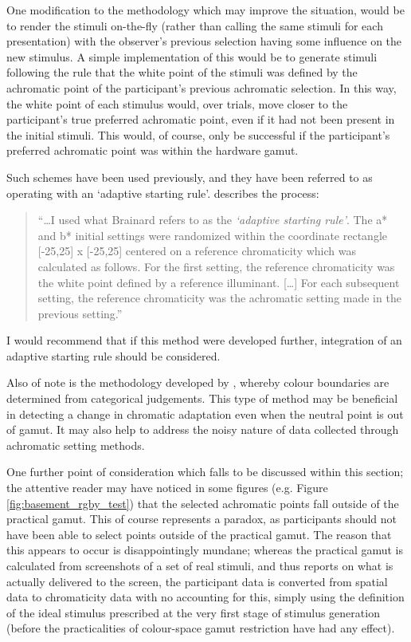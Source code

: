 One modification to the methodology which may improve the situation, would be to render the stimuli on-the-fly (rather than calling the same stimuli for each presentation) with the observer's previous selection having some influence on the new stimulus. A simple implementation of this would be to generate stimuli following the rule that the white point of the stimuli was defined by the achromatic point of the participant's previous achromatic selection. In this way, the white point of each stimulus would, over trials, move closer to the participant's true preferred achromatic point, even if it had not been present in the initial stimuli. This would, of course, only be successful if the participant's preferred achromatic point was within the hardware gamut. 

Such schemes have been used previously, and they have been referred to as operating with an `adaptive starting rule'. \citet{delahunt_evaluation_2001} describes the process:

\begin{quote}
``\dots I used what Brainard refers to as the \emph{`adaptive starting rule'}. The a* and b* initial settings were randomized within the coordinate rectangle [-25,25] x [-25,25] centered on a reference chromaticity which was calculated as follows. For the first setting, the reference chromaticity was the white point defined by a reference illuminant. [\dots] For each subsequent setting, the reference chromaticity was the achromatic setting made in the previous setting.''
\end{quote}

I would recommend that if this method were developed further, integration of an adaptive starting rule should be considered.

Also of note is the methodology developed by \citet{smithson_colour_2004}, whereby colour boundaries are determined from categorical judgements. This type of method may be beneficial in detecting a change in chromatic adaptation even when the neutral point is out of gamut. It may also help to address the noisy nature of data collected through achromatic setting methods.

One further point of consideration which falls to be discussed within this section; the attentive reader may have noticed in some figures (e.g. Figure \ref{fig:basement_rgby_test}) that the selected achromatic points fall outside of the practical gamut. This of course represents a paradox, as participants should not have been able to select points outside of the practical gamut. The reason that this appears to occur is disappointingly mundane; whereas the practical gamut is calculated from screenshots of a set of real stimuli, and thus reports on what is actually delivered to the screen, the participant data is converted from spatial data to chromaticity data with no accounting for this, simply using the definition of the ideal stimulus prescribed at the very first stage of stimulus generation (before the practicalities of colour-space gamut restriction have had any effect).

